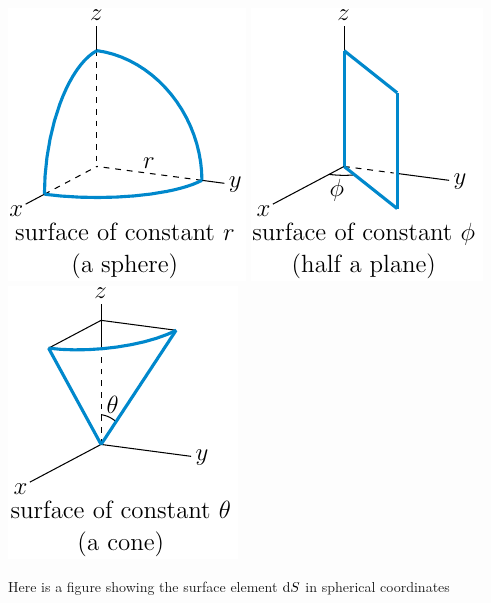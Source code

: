 \begin{wfig}
\begin{center}
    \includegraphics{spher2.pdf}\qquad
    \includegraphics{spher3.pdf}\qquad
    \includegraphics{spher4.pdf}
\end{center}
\end{wfig}
Here is a figure showing the surface element $\mathrm{d}S$ in
spherical coordinates

